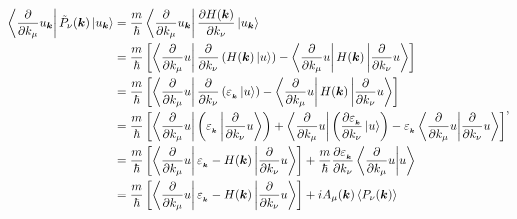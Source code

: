 \documentclass{report}
\renewcommand\vec[1]{\ensuremath\boldsymbol{#1}} %
\begin{document}
$$
\begin{aligned}
	\bra{\frac{\partial}{\partial k_\mu} u_{\vec{k}}} \tilde{P}_\nu (\vec{k}) \ket{u_{\vec{k}}} &= \frac{m}{\hbar} \bra{\frac{\partial}{\partial k_\mu} u_{\vec{k}}} \frac{\partial H(\vec{k})}{\partial k_\nu} \ket{u_{\vec{k}}} \\
	&= \frac{m}{\hbar} \left[\bra{\frac{\partial}{\partial k_\mu} u} \frac{\partial}{\partial k_\nu} \left(H(\vec{k}) \ket{u}\right) - \bra{\frac{\partial}{\partial k_\mu} u}H(\vec{k})\ket{\frac{\partial}{\partial k_\nu} u}\right] \\
	&= \frac{m}{\hbar} \left[\bra{\frac{\partial}{\partial k_\mu} u} \frac{\partial}{\partial k_\nu} \left(\varepsilon_{_{\vec{k}}} \ket{u}\right) - \bra{\frac{\partial}{\partial k_\mu} u}H(\vec{k})\ket{\frac{\partial}{\partial k_\nu} u}\right]\\
	&= \frac{m}{\hbar} \left[\bra{\frac{\partial}{\partial k_\mu} u}  \left(\varepsilon_{_{\vec{k}}} \ket{\frac{\partial}{\partial k_\nu}u}\right)  +  \bra{\frac{\partial}{\partial k_\mu} u}  \left(\frac{\partial \varepsilon_{_{\vec{k}}}}{\partial k_\nu} \ket{u}\right) - \varepsilon_{_{\vec{k}}} \bra{\frac{\partial}{\partial k_\mu} u}\ket{\frac{\partial}{\partial k_\nu} u}\right]\\
	&= \frac{m}{\hbar} \left[\bra{\frac{\partial}{\partial k_\mu} u}  \varepsilon_{_{\vec{k}}} - H(\vec{k}) \ket{\frac{\partial}{\partial k_\nu}u}\right]  +  \frac{m}{\hbar} \frac{\partial \varepsilon_{_{\vec{k}}}}{\partial k_\nu} \bra{\frac{\partial}{\partial k_\mu} u} \ket{u} \\
	&= \frac{m}{\hbar} \left[\bra{\frac{\partial}{\partial k_\mu} u}  \varepsilon_{_{\vec{k}}} - H(\vec{k}) \ket{\frac{\partial}{\partial k_\nu}u}\right]  +  i {A}_\mu(\vec{k}) \expval{{P}_\nu(\vec{k})}
\end{aligned},
$$
\end{document}
